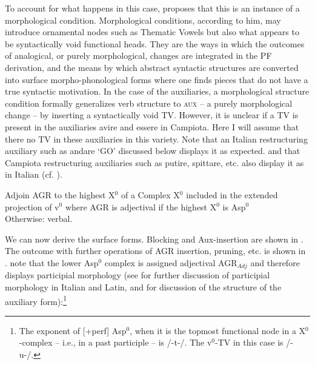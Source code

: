\documentclass[output=paper]{langscibook}
\begin{document}
{To account for what happens in this case, \citet{calabrese2019a, calabrese2020a} proposes  that this is an instance of a morphological condition. Morphological conditions, according to him, may introduce ornamental nodes such as Thematic Vowels but also what appears to be syntactically void functional heads. They are the ways in which the outcomes of analogical, or purely morphological, changes are integrated in the PF derivation, and the means by which abstract syntactic structures are converted into surface morpho-phonological forms where one finds pieces that do not have a true syntactic motivation. In the case of the auxiliaries, a morphological structure condition formally generalizes verb structure to \textsc{aux} --  a purely morphological change  --  by inserting a syntactically void TV. However, it is unclear if a TV is present in the auxiliaries avire and essere in Campiota. Here I will assume that there no TV in these auxiliaries in this variety.  Note that an Italian restructuring auxiliary such as andare ‘GO’ discussed below displays it as expected. and that Campiota restructuring auxiliaries such as putire, spittare, etc. also display it as in Italian (cf. ).}

\ea \label{ac75} Adjoin AGR to the highest X$^0$ of a Complex X$^0$ included in the extended projection of v$^0$
    \ea \label{ac75a}where AGR is adjectival if the highest X$^0$ is Asp$^0$\\
        Otherwise:
    \ex \label{ac75b}verbal.
   \z
\z

We can now derive the surface forms. Blocking and Aux-insertion are shown in .  The outcome with further operations of AGR insertion, pruning, etc. is shown in .  note that the lower Asp$^0$ complex is assigned adjectival AGR$_{Adj}$ and therefore displays participial morphology (see \citet{calabrese2020a} for further discussion of participial morphology in Italian and Latin, and \citet{calabrese2019a} for discussion of the structure of the auxiliary form):\footnote{The exponent of [+perf] Asp$^0$, when it is the topmost functional node in a X$^0$-complex -- i.e., in a past participle --  is /-t-/.  The v$^0$-TV in this case is /-u-/.}
\end{document}
